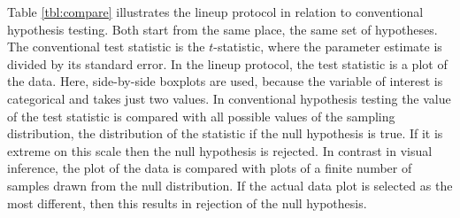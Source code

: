 \documentclass[12pt]{article}
\begin{document}
Table \ref{tbl:compare} illustrates the lineup protocol in relation to conventional hypothesis testing. Both start from the same place, the same set of hypotheses. The conventional test statistic is the $t$-statistic, where the parameter estimate is divided by its standard error. In the lineup protocol, the test statistic is a plot of the data. Here, side-by-side boxplots are used, because the variable of interest is categorical and takes just two values. In conventional hypothesis testing the value of the test statistic is compared with all possible values of the sampling distribution, the distribution of the statistic if the null hypothesis is true. If it is extreme on this scale then the null hypothesis is rejected. In contrast in visual inference, the plot of the data is compared with plots of a finite number of samples drawn from the null distribution. If the actual data plot is selected as the most different, then this results in rejection of the null hypothesis.
\end{document}
